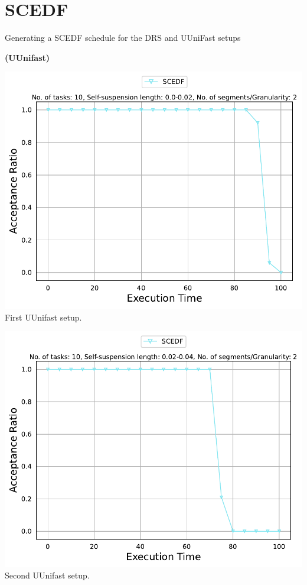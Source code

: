 \documentclass[]{article}
\begin{document}
        \section{SCEDF}
{
\raggedleft Generating a SCEDF schedule for the DRS and UUniFast setups \newline
}

	\begin{minipage}[t]{0.48\linewidth}
		\centering
		\textbf{(UUnifast)}
		\vspace{0.3cm}
		
		\includegraphics[width=\linewidth]{SCEDF[2][0.0-0.02][10].pdf}
		First UUnifast setup.
		\vspace{0.3cm}
		
		\includegraphics[width=\linewidth]{SCEDF[2][0.02-0.04][10].pdf}
		Second UUnifast setup.
		\vspace{0.3cm}
		

\end{minipage}
\end{document}
